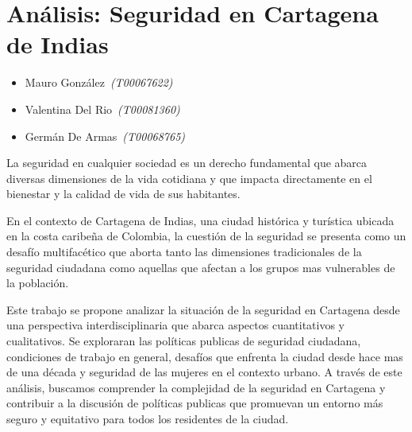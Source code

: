 \documentclass[letterpaper, 12pt]{article}
\begin{document}
\section*{Análisis: Seguridad en Cartagena de Indias}

\noindent\makebox[\linewidth]{\rule{\textwidth}{0.4pt}}

\begin{itemize}[label=$\diamond$]
    \item Mauro González~\textit{(T00067622)}
    \item Valentina Del Rio~\textit{(T00081360)}
    \item Germán De Armas~\textit{(T00068765)}
\end{itemize}

\noindent\makebox[\linewidth]{\rule{\textwidth}{0.4pt}}

\nocite{fontalvo_leyes2019}


\nocite{Comunicaciones_2023}
\nocite{Observatorio_2023}
\nocite{MedicinaLegalCienciasForenses_2023}



% 

La seguridad en cualquier sociedad es un derecho
fundamental que abarca diversas dimensiones de la vida
cotidiana y que impacta directamente en el bienestar y la
calidad de vida de sus habitantes.

En el contexto de Cartagena de Indias, una ciudad histórica
y turística ubicada en la costa caribeña de Colombia, la
cuestión de la seguridad se presenta como un desafío
multifacético que aborta tanto las dimensiones
tradicionales de la seguridad ciudadana como aquellas que
afectan a los grupos mas vulnerables de la población.

Este trabajo se propone analizar la situación de la
seguridad en Cartagena desde una perspectiva
interdisciplinaria que abarca aspectos cuantitativos y
cualitativos. Se exploraran las políticas publicas de
seguridad ciudadana, condiciones de trabajo en general,
desafíos que enfrenta la ciudad desde hace mas de una
década y seguridad de las mujeres en el contexto urbano. A
través de este análisis, buscamos comprender la complejidad
de la seguridad en Cartagena y contribuir a la discusión de
políticas publicas que promuevan un entorno más seguro y
equitativo para todos los residentes de la ciudad.
\end{document}
